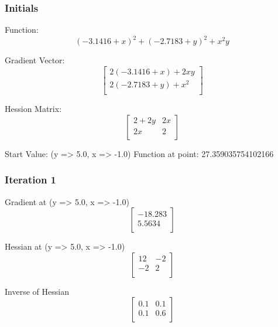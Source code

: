 \documentclass{article}
\begin{document}
\subsubsection{Initials}
Function:
\begin{equation}
\left( -3.1416 + x \right)^{2} + \left( -2.7183 + y \right)^{2} + x^{2} y
\end{equation}

Gradient Vector:
\begin{equation}
\left[
\begin{array}{c}
2 \left( -3.1416 + x \right) + 2 x y \\
2 \left( -2.7183 + y \right) + x^{2} \\
\end{array}
\right]
\end{equation}

Hession Matrix:
\begin{equation}
\left[
\begin{array}{cc}
2 + 2 y & 2 x \\
2 x & 2 \\
\end{array}
\right]
\end{equation}

Start Value:
(y => 5.0, x => -1.0)
Function at point:
27.359035754102166
\subsubsection{Iteration 1}
Gradient at (y => 5.0, x => -1.0)
\begin{equation}
\left[
\begin{array}{c}
-18.283 \\
5.5634 \\
\end{array}
\right]
\end{equation}

Hessian at (y => 5.0, x => -1.0)
\begin{equation}
\left[
\begin{array}{cc}
12 & -2 \\
-2 & 2 \\
\end{array}
\right]
\end{equation}

Inverse of Hessian
\begin{equation}
\left[
\begin{array}{cc}
0.1 & 0.1 \\
0.1 & 0.6 \\
\end{array}
\right]
\end{equation}
\end{document}
